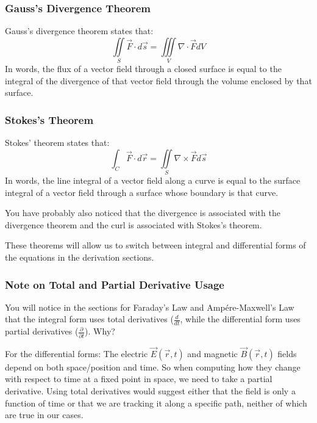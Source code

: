 \documentclass{article}
\begin{document}
\subsubsection{Gauss's Divergence Theorem}
Gauss's divergence theorem states that:
\begin{equation}
\iint\limits_S \vec F \cdot d\vec s = \iiint\limits_V \nabla \cdot \vec F dV
\end{equation}
In words, the flux of a vector field through a closed surface is equal to the integral of the divergence of that vector field through the volume enclosed by that surface.
\subsubsection{Stokes's Theorem}
Stokes' theorem states that:
\begin{equation}
\int_C \vec F \cdot d\vec r = \iint\limits_S \nabla \times \vec F d\vec s
\end{equation}
In words, the line integral of a vector field along a curve is equal to the surface integral of a vector field through a surface whose boundary is that curve.

You have probably also noticed that the divergence is associated with the divergence theorem and the curl is associated with Stokes's theorem.

\vspace{1em}
These theorems will allow us to switch between integral and differential forms of the equations in the derivation sections.

\subsubsection{Note on Total and Partial Derivative Usage}
You will notice in the sections for Faraday's Law and Ampére-Maxwell's Law that the integral form uses total derivatives ($\frac{d}{dt}$, while the differential form uses partial derivatives ($\frac{\partial}{\partial t}$). Why?

\vspace{1em}

For the differential forms: The electric $\vec E(\vec r, t)$ and magnetic $\vec B(\vec r, t)$ fields depend on both space/position and time. So when computing how they change with respect to time at a fixed point in space, we need to take a partial derivative. Using total derivatives would suggest either that the field is only a function of time or that we are tracking it along a specific path, neither of which are true in our cases.
\end{document}
